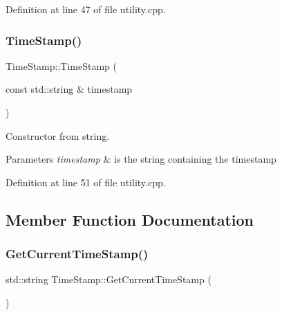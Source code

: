 Definition at line 47 of file utility.\+cpp.

\mbox{\label{structTimeStamp_a30bbacb4047491f083621cf2f3bf1d2e}} 
\subsubsection{\texorpdfstring{Time\+Stamp()}{TimeStamp()}\hspace{0.1cm}{\footnotesize\ttfamily [2/2]}}
{\footnotesize\ttfamily Time\+Stamp\+::\+Time\+Stamp (\begin{DoxyParamCaption}\item[{const std\+::string \&}]{timestamp }\end{DoxyParamCaption})\hspace{0.3cm}{\ttfamily [explicit]}}



Constructor from string. 


\begin{DoxyParams}{Parameters}
{\em timestamp} & is the string containing the timestamp \\
\hline
\end{DoxyParams}


Definition at line 51 of file utility.\+cpp.



\subsection{Member Function Documentation}
\mbox{\label{structTimeStamp_af05020c48d0889c76d9717a88a6b75b9}} 
\subsubsection{\texorpdfstring{Get\+Current\+Time\+Stamp()}{GetCurrentTimeStamp()}}
{\footnotesize\ttfamily std\+::string Time\+Stamp\+::\+Get\+Current\+Time\+Stamp (\begin{DoxyParamCaption}{ }\end{DoxyParamCaption})\hspace{0.3cm}{\ttfamily [static]}}



